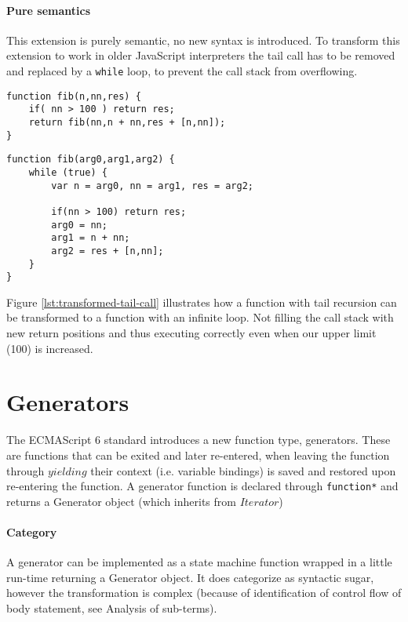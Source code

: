 \paragraph{Pure semantics}
This extension is purely semantic, no new syntax is introduced. To transform this extension to work in older JavaScript interpreters the tail call has to be removed and replaced by a \lstinline$while$ loop, to prevent the call stack from overflowing.

\begin{lstlisting}[caption={Function with tail recursion},label={lst:tail-call}]
function fib(n,nn,res) {
	if( nn > 100 ) return res;
	return fib(nn,n + nn,res + [n,nn]);
}
\end{lstlisting}

\begin{lstlisting}[caption={Semantically identical function, without tail recursion},label={lst:transformed-tail-call}]
function fib(arg0,arg1,arg2) {
	while (true) {
		var n = arg0, nn = arg1, res = arg2;

		if(nn > 100) return res;
		arg0 = nn;
		arg1 = n + nn;
		arg2 = res + [n,nn];
	}
}
\end{lstlisting}

Figure \ref{lst:transformed-tail-call} illustrates how a function with tail recursion can be transformed to a function with an infinite loop. Not filling the call stack with new return positions and thus executing correctly even when our upper limit (100) is increased.

\section{Generators}
The ECMAScript 6 standard introduces a new function type, generators\cite[14.4]{SpecJS}. These are functions that can be exited and later re-entered, when leaving the function through $yielding$ their context (i.e. variable bindings) is saved and restored upon re-entering the function. A generator function is declared through \lstinline$function*$ and returns a Generator object (which inherits from $Iterator$)

\paragraph{Category}
A generator can be implemented as a state machine function wrapped in a little run-time returning a Generator object. It does categorize as syntactic sugar, however the transformation is complex (because of identification of control flow of body statement, see Analysis of sub-terms). 

